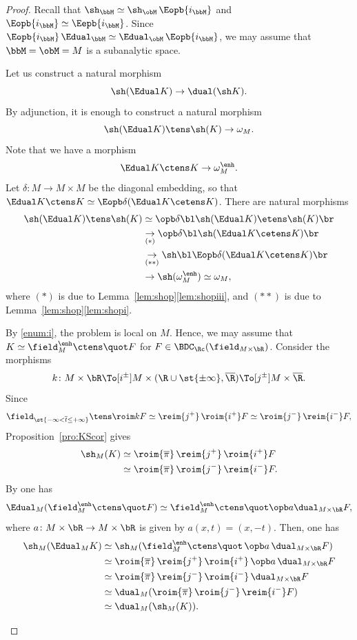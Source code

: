 \begin{proof}
Recall that $\sh_\bbM \simeq \sh_\obM \, \Eopb{i_\bbM}$
and $\Eopb{i_\bbM}\simeq\Eepb{i_\bbM}$.
Since $\Eopb{i_\bbM} \, \Edual_\bbM \simeq \Edual_\obM \, \Eopb{i_\bbM}$,
we may assume that $\bbM=\obM=M$ is a subanalytic space.

\begin{enumeratei}
\item\label{enum:i}
Let us construct a natural morphism
\[
\sh( \Edual K) \to \dual( \sh K).
\]
By adjunction, it is enough to construct a natural morphism
\[
\sh( \Edual K)\tens\sh(K) \to \omega_M.
\]
Note that we have a morphism
\[
\Edual K\ctens K \to \omega_M^\enh.
\]
Let $\delta\colon M\to M\times M$ be the diagonal embedding, so that
$\Edual K\ctens K\simeq\Eopb\delta(\Edual K\cetens K)$.
There are natural morphisms
\begin{align*}
\sh(\Edual K)\tens\sh(K)
&\simeq \opb\delta\bl\sh(\Edual K)\etens\sh(K)\br \\
&\underset{(*)}\to \opb\delta\bl\sh(\Edual K\cetens K)\br \\
&\underset{(**)}\to \sh\bl\Eopb\delta(\Edual K\cetens K)\br \\
&\to \sh(\omega^\enh_M) \simeq \omega_M,
\end{align*}
where $(*)$ is due to Lemma~\ref{lem:shop}\eqref{lem:shopiii}, and $(**)$ is due to Lemma~\ref{lem:shop}\eqref{lem:shopi}.

\item\label{enum:ii}
By \eqref{enum:i}, the problem is local on $M$. Hence, we may assume that
$K\simeq\field_M^\enh \ctens \quot F$ for $F\in\BDC_\Rc(\field_{M\times\bR})$.
Consider the morphisms
\[
k\colon M\times\bR \To[i^\pm] M\times(\R\cup\st{\pm\infty},\overline\R) \To[j^\pm] M\times\overline\R.
\]
Since
\[
\field_{\st{-\infty<\overline t\leq+\infty}}\tens\roim k F
\simeq \reim{j^+}\,\roim{i^+} F
\simeq \roim{j^-}\,\reim{i^-} F,
\]
Proposition~\ref{pro:KScor} gives
\begin{align*}
\sh_M(K)
&\simeq \roim{\overline\pi}\,\reim{j^+}\,\roim{i^+} F \\
&\simeq \roim{\overline\pi}\,\roim{j^-}\,\reim{i^-} F.
\end{align*}
By \cite[Prop.\,4.8.3]{DK16} one has
\[
\Edual_M(\field_M^\enh \ctens \quot F) \simeq \field_M^\enh \ctens \quot \opb a\dual_{M\times\bR} F,
\]
where $a\colon M\times\bR\to M\times\bR$ is given by $a(x,t)=(x,-t)$.
Then, one has
\begin{align*}
\sh_M(\Edual_M K)
&\simeq \sh_M(\field_M^\enh \ctens \quot \,\opb a\,\dual_{M\times\bR} F) \\
&\simeq \roim{\overline\pi}\,\reim{j^+}\,\roim{i^+} \,\opb a\,\dual_{M\times\bR} F \\
&\simeq \roim{\overline\pi}\,\reim{j^-}\,\roim{i^-} \,\dual_{M\times\bR} F \\
&\simeq \dual_M (\roim{\overline\pi}\,\roim{j^-}\,\reim{i^-} F) \\
&\simeq \dual_M (\sh_M(K)).\qedhere
\end{align*}
\end{enumeratei}
\end{proof}

